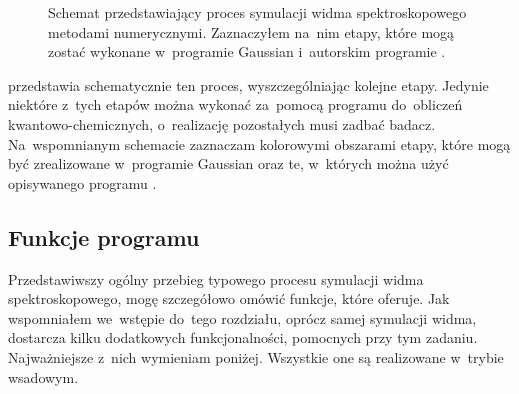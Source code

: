 \begin{figure*}
  
  \caption{
    Schemat przedstawiający proces symulacji widma spektroskopowego metodami numerycznymi.
    Zaznaczyłem na~nim etapy, które mogą zostać wykonane w~programie Gaussian i~autorskim
      programie \tesliper{}.
  }\label{fig:simulation-flow}
\end{figure*}

 przedstawia schematycznie ten proces, wyszczególniając kolejne etapy.
Jedynie niektóre z~tych etapów można wykonać za~pomocą programu do~obliczeń kwantowo-chemicznych,
  o~realizację pozostałych musi zadbać badacz.
Na~wspomnianym schemacie zaznaczam kolorowymi obszarami etapy, które mogą być zrealizowane
  w~programie Gaussian oraz te, w~których można użyć opisywanego programu \tesliper{}.

\subsection{Funkcje programu}\label{essence:features}
Przedstawiwszy ogólny przebieg typowego procesu symulacji widma spektroskopowego,
  mogę szczegółowo omówić funkcje, które \tesliper{} oferuje.
Jak wspomniałem we~wstępie do~tego rozdziału, oprócz samej symulacji widma, \tesliper{}
  dostarcza kilku dodatkowych funkcjonalności, pomocnych przy tym zadaniu.
Najważniejsze z~nich wymieniam poniżej.
Wszystkie one są realizowane w~trybie wsadowym.  

